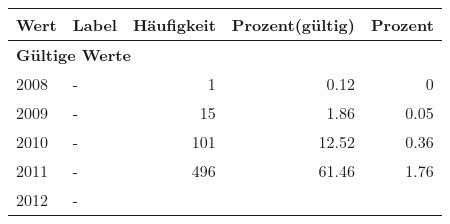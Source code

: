      \begin{longtable}{lXrrr}
     \toprule
     \textbf{Wert} & \textbf{Label} & \textbf{Häufigkeit} & \textbf{Prozent(gültig)} & \textbf{Prozent} \\
     \endhead
     \midrule
     \multicolumn{5}{l}{\textbf{Gültige Werte}}\\

     2008 &
     \multicolumn{1}{X}{ -  } &


       \num{1} &
       \num[round-mode=places,round-precision=2]{0,12} &
         \num[round-mode=places,round-precision=2]{0} \\

     2009 &
     \multicolumn{1}{X}{ -  } &


       \num{15} &
       \num[round-mode=places,round-precision=2]{1,86} &
         \num[round-mode=places,round-precision=2]{0,05} \\

     2010 &
     \multicolumn{1}{X}{ -  } &


       \num{101} &
       \num[round-mode=places,round-precision=2]{12,52} &
         \num[round-mode=places,round-precision=2]{0,36} \\

     2011 &
     \multicolumn{1}{X}{ -  } &


       \num{496} &
       \num[round-mode=places,round-precision=2]{61,46} &
         \num[round-mode=places,round-precision=2]{1,76} \\

     2012 &
     \multicolumn{1}{X}{ -  } &



\end{longtable}
